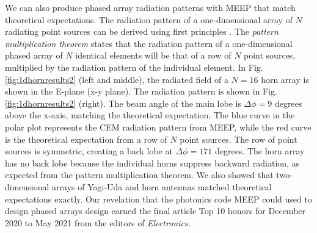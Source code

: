 \documentclass[../../main.tex]{subfiles}
\begin{document}
We can also produce phased array radiation patterns with MEEP that match theoretical expectations.  The radiation pattern of a one-dimensional array of $N$ radiating point sources can be derived using first principles \cite{electronics10040415}.  The \textit{pattern multiplication theorem} states that the radiation pattern of a one-dimensional phased array of $N$ identical elements will be that of a row of $N$ point sources, multiplied by the radiation pattern of the individual element.  In Fig. \ref{fig:1dhornresults2} (left and middle), the radiated field of a $N=16$ horn array is shown in the E-plane (x-y plane).  The radiation pattern is shown in Fig. \ref{fig:1dhornresults2} (right).  The beam angle of the main lobe is $\Delta \phi = 9$ degrees above the x-axis, matching the theoretical expectation.  The blue curve in the polar plot represents the CEM radiation pattern from MEEP, while the red curve is the theoretical expectation from a row of $N$ point sources.  The row of point sources is symmetric, creating a back lobe at $\Delta \phi = 171$ degrees.  The horn array has no back lobe because the individual horns suppress backward radiation, as expected from the pattern multiplication theorem.  We also showed that two-dimensional arrays of Yagi-Uda and horn antennas matched theoretical expectations exactly.  Our revelation that the photonics code MEEP could used to design phased arrays design earned the final article Top 10 honors for December 2020 to May 2021 from the editors of \textit{Electronics}. \\ \vspace{2.5mm}
\end{document}
